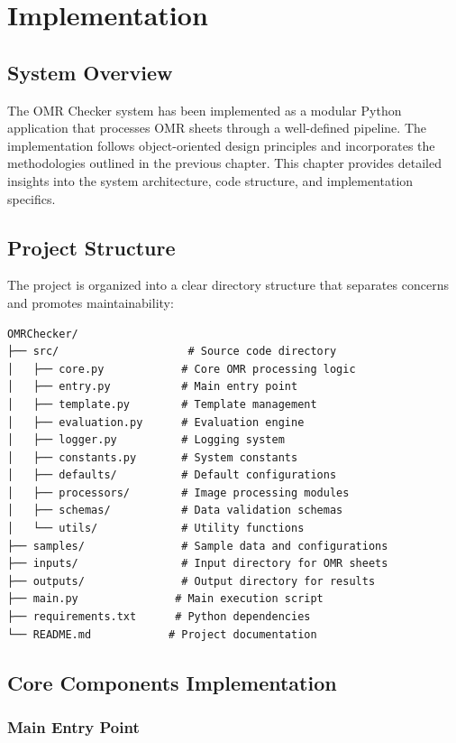 \chapter{Implementation}
\label{ch:implementation}

\section{System Overview}

The OMR Checker system has been implemented as a modular Python application that processes OMR sheets through a well-defined pipeline. The implementation follows object-oriented design principles and incorporates the methodologies outlined in the previous chapter. This chapter provides detailed insights into the system architecture, code structure, and implementation specifics.

\section{Project Structure}

The project is organized into a clear directory structure that separates concerns and promotes maintainability:

\begin{verbatim}
OMRChecker/
├── src/                    # Source code directory
│   ├── core.py            # Core OMR processing logic
│   ├── entry.py           # Main entry point
│   ├── template.py        # Template management
│   ├── evaluation.py      # Evaluation engine
│   ├── logger.py          # Logging system
│   ├── constants.py       # System constants
│   ├── defaults/          # Default configurations
│   ├── processors/        # Image processing modules
│   ├── schemas/           # Data validation schemas
│   └── utils/             # Utility functions
├── samples/               # Sample data and configurations
├── inputs/                # Input directory for OMR sheets
├── outputs/               # Output directory for results
├── main.py               # Main execution script
├── requirements.txt      # Python dependencies
└── README.md            # Project documentation
\end{verbatim}

\section{Core Components Implementation}

\subsection{Main Entry Point}

